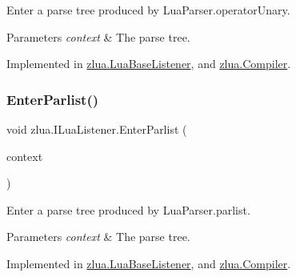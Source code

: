 Enter a parse tree produced by Lua\+Parser.\+operator\+Unary. 


\begin{DoxyParams}{Parameters}
{\em context} & The parse tree.\\
\hline
\end{DoxyParams}


Implemented in \mbox{\hyperlink{classzlua_1_1_lua_base_listener_ac5f8a27439dcc1dbabbc0a23508f7013}{zlua.\+Lua\+Base\+Listener}}, and \mbox{\hyperlink{classzlua_1_1_compiler_a1c085d48a4bc63b7b42cb8763f643bb2}{zlua.\+Compiler}}.

\mbox{\label{interfacezlua_1_1_i_lua_listener_a406fd2bdc9cefe77567f3012bed007e9}} 
\subsubsection{\texorpdfstring{Enter\+Parlist()}{EnterParlist()}}
{\footnotesize\ttfamily void zlua.\+I\+Lua\+Listener.\+Enter\+Parlist (\begin{DoxyParamCaption}\item[{\mbox{[}\+Not\+Null\mbox{]} \mbox{\hyperlink{classzlua_1_1_lua_parser_1_1_parlist_context}{Lua\+Parser.\+Parlist\+Context}}}]{context }\end{DoxyParamCaption})}



Enter a parse tree produced by Lua\+Parser.\+parlist. 


\begin{DoxyParams}{Parameters}
{\em context} & The parse tree.\\
\hline
\end{DoxyParams}


Implemented in \mbox{\hyperlink{classzlua_1_1_lua_base_listener_a731d7b4d2ae1ef89c04c01da08cddbc7}{zlua.\+Lua\+Base\+Listener}}, and \mbox{\hyperlink{classzlua_1_1_compiler_a6cca7cfa803b7be16090f38ffd6b7186}{zlua.\+Compiler}}.

\mbox{\label{interfacezlua_1_1_i_lua_listener_a4b07c7ca53f3650fc8b83891467f7a66}} 
